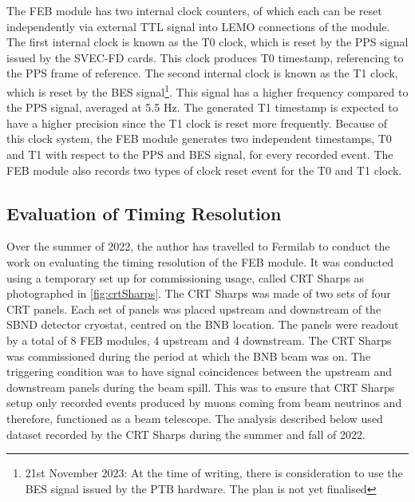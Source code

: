 The FEB module has two internal clock counters, of which each can be reset independently via external TTL signal into LEMO connections of the module.
The first internal clock is known as the T0 clock, which is reset by the PPS signal issued by the SVEC-FD cards. 
This clock produces T0 timestamp, referencing to the PPS frame of reference.
The second internal clock is known as the T1 clock, which is reset by the BES signal\footnote{21st November 2023: At the time of writing, there is consideration to use the BES signal issued by the PTB hardware. The plan is not yet finalised}.
This signal has a higher frequency compared to the PPS signal, averaged at 5.5 Hz.
The generated T1 timestamp is expected to have a higher precision since the T1 clock is reset more frequently. 
Because of this clock system, the FEB module generates two independent timestamps, T0 and T1 with respect to the PPS and BES signal, for every recorded event.
The FEB module also records two types of clock reset event for the T0 and T1 clock.

\subsection{Evaluation of Timing Resolution}

Over the summer of 2022, the author has travelled to Fermilab to conduct the work on evaluating the timing resolution of the FEB module.
It was conducted using a temporary set up for commissioning usage, called CRT Sharps as photographed in \ref{fig:crtSharps}.
The CRT Sharps was made of two sets of four CRT panels. 
Each set of panels was placed upstream and downstream of the SBND detector cryostat, centred on the BNB location.
The panels were readout by a total of 8 FEB modules, 4 upstream and 4 downstream.
The CRT Sharps was commissioned during the period at which the BNB beam was on. 
The triggering condition was to have signal coincidences between the upstream and downstream panels during the beam spill.
This was to ensure that CRT Sharps setup only recorded events produced by muons coming from beam neutrinos and therefore, functioned as a beam telescope.
The analysis described below used dataset recorded by the CRT Sharps during the summer and fall of 2022.

